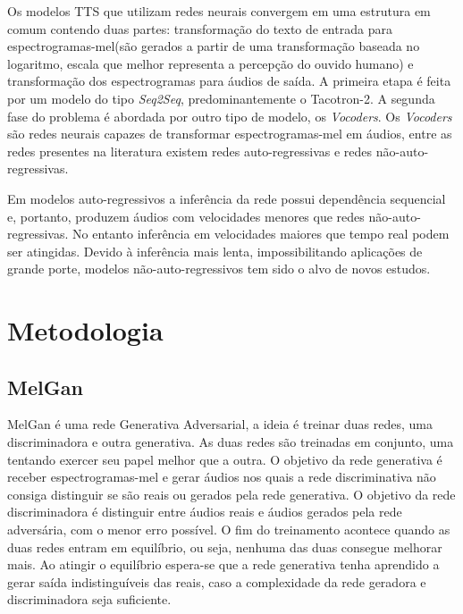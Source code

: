 \documentclass{article}
\begin{document}
Os modelos TTS que utilizam redes neurais convergem em uma estrutura em comum contendo duas partes: transformação do texto de entrada para espectrogramas-mel(são gerados a partir de uma transformação baseada no logaritmo, escala que melhor representa a percepção do ouvido humano) e transformação dos espectrogramas para áudios de saída. A primeira etapa é feita por um modelo do tipo \textit{Seq2Seq}, predominantemente o Tacotron-2\cite{tacotron2}. A segunda fase do problema é abordada por outro tipo de modelo, os \textit{Vocoders}. Os \textit{Vocoders} são redes neurais capazes de transformar espectrogramas-mel em áudios, entre as redes presentes na literatura existem redes auto-regressivas\cite{wavenet}\cite{wavernn} e redes não-auto-regressivas\cite{clarinet}\cite{parallelwavenet}\cite{WaveGLOW}.

Em modelos auto-regressivos a inferência da rede possui dependência sequencial e, portanto, produzem áudios com velocidades menores que redes não-auto-regressivas. No entanto inferência em velocidades maiores que tempo real podem ser atingidas. Devido à inferência mais lenta, impossibilitando aplicações de grande porte, modelos não-auto-regressivos tem sido o alvo de novos estudos. 

\section{Metodologia}
\label{sec:format}


\subsection{MelGan}

MelGan\cite{melgan} é uma rede Generativa Adversarial, a ideia é treinar duas redes, uma discriminadora e outra generativa. As duas redes são treinadas em conjunto, uma tentando exercer seu papel melhor que a outra. O objetivo da rede generativa é receber espectrogramas-mel e gerar áudios nos quais a rede discriminativa não consiga distinguir se são reais ou gerados pela rede generativa. O objetivo da rede discriminadora é distinguir entre áudios reais e áudios gerados pela rede adversária, com o menor erro possível. O fim do treinamento acontece quando as duas redes entram em equilíbrio, ou seja, nenhuma das duas consegue melhorar mais. Ao atingir o equilíbrio espera-se que a rede generativa tenha aprendido a gerar saída indistinguíveis das reais, caso a complexidade da rede geradora e discriminadora seja suficiente.
\end{document}
